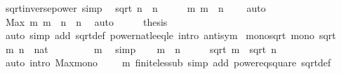 \begin{isabellebody}
{\isafoldproof}%
%
\isadelimproof
\isanewline
%
\endisadelimproof
\isanewline
{}\isamarkupfalse%
\ sqrt{\isacharunderscore}inverse{\isacharunderscore}power{}\ {\isacharbrackleft}simp{\isacharbrackright}{\isacharcolon}\isanewline
\ \ {\isachardoublequoteopen}sqrt\ {\isacharparenleft}n\ {\isacharequal}\ n{\isachardoublequoteclose}\isanewline
%
\isadelimproof
%
\endisadelimproof
%
\isatagproof
{}\isamarkupfalse%
\ {\isacharminus}\isanewline
\ \ \isamarkupfalse%
\ {\isachardoublequoteopen}{\isacharbraceleft}m{\isachardot}\ m\ {\isasymle}\ n{\isacharbraceright}\ {\isasymnoteq}\ {\isacharbraceleft}{\isacharbraceright}{\isachardoublequoteclose}\ \isamarkupfalse%
\ auto\isanewline
\ \ \isamarkupfalse%
\ \isamarkupfalse%
\ {\isachardoublequoteopen}Max\ {\isacharbraceleft}m{\isachardot}\ m\ {\isasymle}\ n{\isacharbraceright}\ {\isasymle}\ n{\isachardoublequoteclose}\ \isamarkupfalse%
\ auto\isanewline
\ \ \isamarkupfalse%
\ \isamarkupfalse%
\ {\isacharquery}thesis\isanewline
\ \ \ \ \isamarkupfalse%
\ {\isacharparenleft}auto\ simp\ add{\isacharcolon}\ sqrt{\isacharunderscore}def\ power{}{\isacharunderscore}nat{\isacharunderscore}le{\isacharunderscore}eq{\isacharunderscore}le\ intro{\isacharcolon}\ antisym{\isacharparenright}\isanewline
{}\isamarkupfalse%
%
\endisatagproof
{\isafoldproof}%
%
\isadelimproof
\isanewline
%
\endisadelimproof
\isanewline
{}\isamarkupfalse%
\ mono{\isacharunderscore}sqrt{\isacharcolon}\ {\isachardoublequoteopen}mono\ sqrt{\isachardoublequoteclose}\isanewline
%
\isadelimproof
%
\endisadelimproof
%
\isatagproof
{}\isamarkupfalse%
\isanewline
\ \ \isamarkupfalse%
\ m\ n\ {\isacharcolon}{\isacharcolon}\ nat\isanewline
\ \ \isamarkupfalse%
\ {\isacharasterisk}{\isacharcolon}\ {\isachardoublequoteopen}{}\ {\isacharasterisk}\ {}\ {\isasymle}\ m{\isachardoublequoteclose}\ \isamarkupfalse%
\ simp\isanewline
\ \ \isamarkupfalse%
\ {\isachardoublequoteopen}m\ {\isasymle}\ n{\isachardoublequoteclose}\isanewline
\ \ \isamarkupfalse%
\ \isamarkupfalse%
\ {\isachardoublequoteopen}sqrt\ m\ {\isasymle}\ sqrt\ n{\isachardoublequoteclose}\isanewline
\ \ \ \ \isamarkupfalse%
\ {\isacharparenleft}auto\ intro{\isacharbang}{\isacharcolon}\ Max{\isacharunderscore}mono\ {\isacharbackquoteopen}{}\ {\isacharasterisk}\ {}\ {\isasymle}\ m{\isacharbackquoteclose}\ finite{\isacharunderscore}less{\isacharunderscore}ub\ simp\ add{\isacharcolon}\ power{}{\isacharunderscore}eq{\isacharunderscore}square\ sqrt{\isacharunderscore}def{\isacharparenright}\isanewline

\end{isabellebody}
